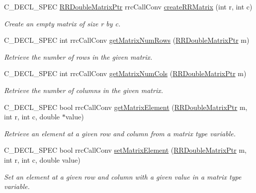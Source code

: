 \begin{DoxyCompactItemize}
C\+\_\+\+D\+E\+C\+L\+\_\+\+S\+P\+E\+C \hyperlink{rrc__types_8h_ae586a879d30f0823087e42d93464b5dd}{R\+R\+Double\+Matrix\+Ptr} rrc\+Call\+Conv \hyperlink{group__helper_routines_gabf1979f15bd6b02315b3f9d880fded85}{create\+R\+R\+Matrix} (int r, int c)
\begin{DoxyCompactList}\small\item\em Create an empty matrix of size r by c. \end{DoxyCompactList}\item 
C\+\_\+\+D\+E\+C\+L\+\_\+\+S\+P\+E\+C int rrc\+Call\+Conv \hyperlink{group__helper_routines_ga13d0d619adf01ca451033e742aaed38e}{get\+Matrix\+Num\+Rows} (\hyperlink{rrc__types_8h_ae586a879d30f0823087e42d93464b5dd}{R\+R\+Double\+Matrix\+Ptr} m)
\begin{DoxyCompactList}\small\item\em Retrieve the number of rows in the given matrix. \end{DoxyCompactList}\item 
C\+\_\+\+D\+E\+C\+L\+\_\+\+S\+P\+E\+C int rrc\+Call\+Conv \hyperlink{group__helper_routines_ga643d224921897abead4fdcdf1e1e362e}{get\+Matrix\+Num\+Cols} (\hyperlink{rrc__types_8h_ae586a879d30f0823087e42d93464b5dd}{R\+R\+Double\+Matrix\+Ptr} m)
\begin{DoxyCompactList}\small\item\em Retrieve the number of columns in the given matrix. \end{DoxyCompactList}\item 
C\+\_\+\+D\+E\+C\+L\+\_\+\+S\+P\+E\+C bool rrc\+Call\+Conv \hyperlink{group__helper_routines_gaa33df22ddaa04d8703c1535904080886}{get\+Matrix\+Element} (\hyperlink{rrc__types_8h_ae586a879d30f0823087e42d93464b5dd}{R\+R\+Double\+Matrix\+Ptr} m, int r, int c, double $\ast$value)
\begin{DoxyCompactList}\small\item\em Retrieve an element at a given row and column from a matrix type variable. \end{DoxyCompactList}\item 
C\+\_\+\+D\+E\+C\+L\+\_\+\+S\+P\+E\+C bool rrc\+Call\+Conv \hyperlink{group__helper_routines_ga6006f42f161e87a1b1a98fbcc42bea20}{set\+Matrix\+Element} (\hyperlink{rrc__types_8h_ae586a879d30f0823087e42d93464b5dd}{R\+R\+Double\+Matrix\+Ptr} m, int r, int c, double value)
\begin{DoxyCompactList}\small\item\em Set an element at a given row and column with a given value in a matrix type variable. \end{DoxyCompactList}\item 

\end{DoxyCompactItemize}
